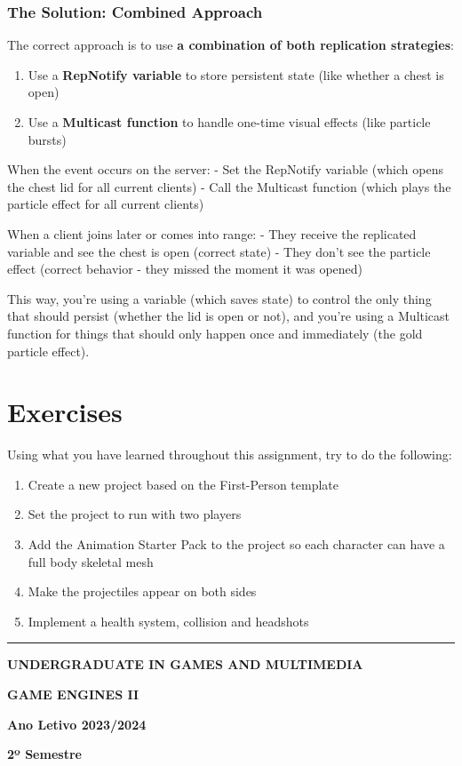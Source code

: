 \documentclass[
  letterpaper,
  DIV=11,
  numbers=noendperiod]{scrartcl}
\providecommand{\tightlist}{%
  \setlength{\itemsep}{0pt}\setlength{\parskip}{0pt}}
\begin{document}
\subsubsection{The Solution: Combined
Approach}\label{the-solution-combined-approach}

The correct approach is to use \textbf{a combination of both replication
strategies}:

\begin{enumerate}
\def\labelenumi{\arabic{enumi}.}
\tightlist
\item
  Use a \textbf{RepNotify variable} to store persistent state (like
  whether a chest is open)
\item
  Use a \textbf{Multicast function} to handle one-time visual effects
  (like particle bursts)
\end{enumerate}

When the event occurs on the server: - Set the RepNotify variable (which
opens the chest lid for all current clients) - Call the Multicast
function (which plays the particle effect for all current clients)

When a client joins later or comes into range: - They receive the
replicated variable and see the chest is open (correct state) - They
don't see the particle effect (correct behavior - they missed the moment
it was opened)

This way, you're using a variable (which saves state) to control the
only thing that should persist (whether the lid is open or not), and
you're using a Multicast function for things that should only happen
once and immediately (the gold particle effect).

\section{Exercises}\label{exercises}

Using what you have learned throughout this assignment, try to do the
following:

\begin{enumerate}
\def\labelenumi{\arabic{enumi}.}
\tightlist
\item
  Create a new project based on the First-Person template
\item
  Set the project to run with two players
\item
  Add the Animation Starter Pack to the project so each character can
  have a full body skeletal mesh
\item
  Make the projectiles appear on both sides
\item
  Implement a health system, collision and headshots
\end{enumerate}

\begin{center}\rule{0.5\linewidth}{0.5pt}\end{center}

\textbf{UNDERGRADUATE IN GAMES AND MULTIMEDIA}

\textbf{GAME ENGINES II}

\textbf{Ano Letivo 2023/2024}

\textbf{2º Semestre}
\end{document}
